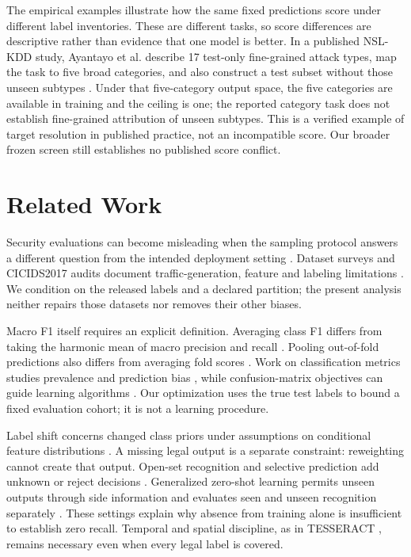 \documentclass[journal]{IEEEtran}
\begin{document}
The empirical examples illustrate how the same fixed predictions score under different label inventories. These are different tasks, so score differences are descriptive rather than evidence that one model is better. In a published NSL-KDD study, Ayantayo et al. describe 17 test-only fine-grained attack types, map the task to five broad categories, and also construct a test subset without those unseen subtypes \cite{ayantayo2023}. Under that five-category output space, the five categories are available in training and the ceiling is one; the reported category task does not establish fine-grained attribution of unseen subtypes. This is a verified example of target resolution in published practice, not an incompatible score. Our broader frozen screen still establishes no published score conflict.

\section{Related Work}
Security evaluations can become misleading when the sampling protocol answers a different question from the intended deployment setting \cite{sommer2010,arp2022}. Dataset surveys and CICIDS2017 audits document traffic-generation, feature and labeling limitations \cite{ring2019,engelen2021,lanvin2023}. We condition on the released labels and a declared partition; the present analysis neither repairs those datasets nor removes their other biases.

Macro F1 itself requires an explicit definition. Averaging class F1 differs from taking the harmonic mean of macro precision and recall \cite{opitzburst2019}. Pooling out-of-fold predictions also differs from averaging fold scores \cite{forman2010}. Work on classification metrics studies prevalence and prediction bias \cite{opitz2024,sokolova2009}, while confusion-matrix objectives can guide learning algorithms \cite{narasimhan2015}. Our optimization uses the true test labels to bound a fixed evaluation cohort; it is not a learning procedure.

Label shift concerns changed class priors under assumptions on conditional feature distributions \cite{lipton2018}. A missing legal output is a separate constraint: reweighting cannot create that output. Open-set recognition and selective prediction add unknown or reject decisions \cite{scheirer2013,geng2021,chow1970,geifman2019}. Generalized zero-shot learning permits unseen outputs through side information and evaluates seen and unseen recognition separately \cite{xian2017}. These settings explain why absence from training alone is insufficient to establish zero recall. Temporal and spatial discipline, as in TESSERACT \cite{pendlebury2019}, remains necessary even when every legal label is covered.
\end{document}
